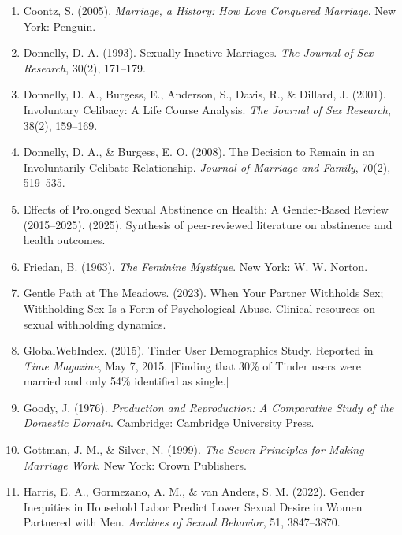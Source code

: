\documentclass[12pt, letterpaper]{article}
\begin{document}
\begin{enumerate}
    \item Coontz, S. (2005). \textit{Marriage, a History: How Love Conquered Marriage}. New York: Penguin.
    
    \item Donnelly, D. A. (1993). Sexually Inactive Marriages. \textit{The Journal of Sex Research}, 30(2), 171--179.
    
    \item Donnelly, D. A., Burgess, E., Anderson, S., Davis, R., \& Dillard, J. (2001). Involuntary Celibacy: A Life Course Analysis. \textit{The Journal of Sex Research}, 38(2), 159--169.
    
    \item Donnelly, D. A., \& Burgess, E. O. (2008). The Decision to Remain in an Involuntarily Celibate Relationship. \textit{Journal of Marriage and Family}, 70(2), 519--535.
    
    \item Effects of Prolonged Sexual Abstinence on Health: A Gender-Based Review (2015--2025). (2025). Synthesis of peer-reviewed literature on abstinence and health outcomes.
    
    \item Friedan, B. (1963). \textit{The Feminine Mystique}. New York: W. W. Norton.
    
    \item Gentle Path at The Meadows. (2023). When Your Partner Withholds Sex; Withholding Sex Is a Form of Psychological Abuse. Clinical resources on sexual withholding dynamics.
    
    \item GlobalWebIndex. (2015). Tinder User Demographics Study. Reported in \textit{Time Magazine}, May 7, 2015. [Finding that 30\% of Tinder users were married and only 54\% identified as single.]
    
    \item Goody, J. (1976). \textit{Production and Reproduction: A Comparative Study of the Domestic Domain}. Cambridge: Cambridge University Press.
    
    \item Gottman, J. M., \& Silver, N. (1999). \textit{The Seven Principles for Making Marriage Work}. New York: Crown Publishers.
    
    \item Harris, E. A., Gormezano, A. M., \& van Anders, S. M. (2022). Gender Inequities in Household Labor Predict Lower Sexual Desire in Women Partnered with Men. \textit{Archives of Sexual Behavior}, 51, 3847--3870.
    

\end{enumerate}
\end{document}
